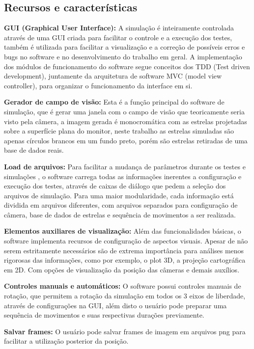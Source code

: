 \subsection{Recursos e características}

\textbf{GUI (Graphical User Interface):} A simulação é inteiramente controlada através de uma GUI criada para facilitar o controle e a execução dos testes, também é utilizada para facilitar a visualização e a correção de possíveis erros e bugs no software e no desenvolvimento do trabalho em geral. A implementação dos módulos de funcionamento do software segue conceitos dos TDD (Test driven  development), juntamente da arquitetura de software MVC (model view controller), para organizar o funcionamento da interface em si.

\textbf{Gerador de campo de visão:} Esta é a função principal do software de simulação, que é gerar uma janela com o campo de visão que teoricamente seria visto pela câmera, a imagem gerada é monocromática com as estrelas projetadas sobre a superfície plana do monitor, neste trabalho as estrelas simuladas são apenas círculos brancos em um fundo preto, porém são estrelas retiradas de uma base de dados reais.

\textbf{Load de arquivos:} Para facilitar a mudança de parâmetros durante os testes e simulações , o software carrega todas as informações inerentes a configuração e execução dos testes, através de caixas de diálogo que pedem a seleção dos arquivos de simulação. Para uma maior modularidade, cada informação está dividida em arquivos diferentes, com arquivos separados para configuração de câmera, base de dados de estrelas e sequência de movimentos a ser realizada.

\textbf{Elementos auxiliares de visualização:} Além das funcionalidades básicas, o software implementa  recursos de configuração  de aspectos visuais. Apesar de não serem estritamente necessários são de extrema importância  para análises menos rigorosas das informações, como por exemplo, o plot 3D, a projeção cartográfica em 2D. Com opções de visualização da posição das câmeras e demais auxílios.

\textbf{Controles manuais e automáticos:} O software possui controles manuais de rotação, que permitem a rotação da simulação em todos os 3 eixos de liberdade, através de configurações na GUI, além disto o usuário pode preparar uma sequência de movimentos e suas respectivas durações previamente.

\textbf{Salvar frames:} O usuário pode salvar frames de imagem em arquivos png para facilitar a utilização posterior da posição.

